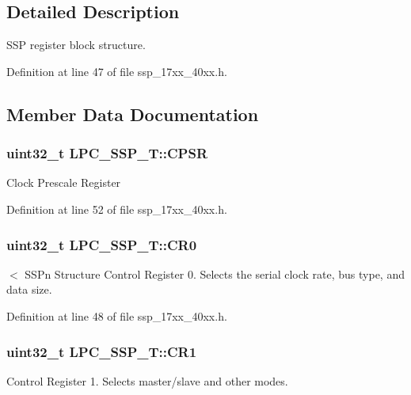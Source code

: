 \subsection{Detailed Description}
S\+SP register block structure. 

Definition at line 47 of file ssp\+\_\+17xx\+\_\+40xx.\+h.



\subsection{Member Data Documentation}
\subsubsection[{\texorpdfstring{C\+P\+SR}{CPSR}}]{ uint32\+\_\+t L\+P\+C\+\_\+\+S\+S\+P\+\_\+\+T\+::\+C\+P\+SR}\hypertarget{structLPC__SSP__T_a48e7161fc6e6b91bd724a17df5435141}{}\label{structLPC__SSP__T_a48e7161fc6e6b91bd724a17df5435141}
Clock Prescale Register 

Definition at line 52 of file ssp\+\_\+17xx\+\_\+40xx.\+h.

\subsubsection[{\texorpdfstring{C\+R0}{CR0}}]{ uint32\+\_\+t L\+P\+C\+\_\+\+S\+S\+P\+\_\+\+T\+::\+C\+R0}\hypertarget{structLPC__SSP__T_af8ad155254cb659608f4c1c6bd83b62b}{}\label{structLPC__SSP__T_af8ad155254cb659608f4c1c6bd83b62b}
$<$ S\+S\+Pn Structure Control Register 0. Selects the serial clock rate, bus type, and data size. 

Definition at line 48 of file ssp\+\_\+17xx\+\_\+40xx.\+h.

\subsubsection[{\texorpdfstring{C\+R1}{CR1}}]{ uint32\+\_\+t L\+P\+C\+\_\+\+S\+S\+P\+\_\+\+T\+::\+C\+R1}\hypertarget{structLPC__SSP__T_a648b740833659e86e8be3a8f6c17147c}{}\label{structLPC__SSP__T_a648b740833659e86e8be3a8f6c17147c}
Control Register 1. Selects master/slave and other modes. 

